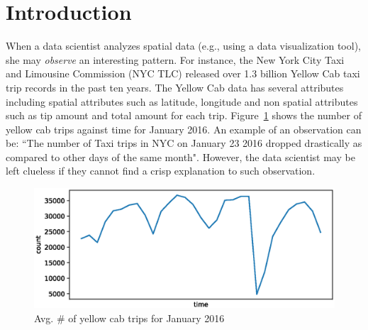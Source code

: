 \label{sec:Intro}
\section{Introduction}

When a data scientist analyzes spatial data (e.g., using a data visualization tool), she may {\em observe} an interesting pattern. 
For instance, the New York City Taxi and Limousine Commission (NYC TLC)\cite{taxi2016tlc} released over 1.3 billion Yellow Cab taxi trip records in the past ten years. The Yellow Cab data has several attributes including spatial attributes such as latitude, longitude and non spatial attributes such as tip amount and total amount for each trip. Figure~\ref{fig:yellowstats} shows the number of yellow cab trips against time for January 2016. 
An example of an observation can be: ``The number of Taxi trips in NYC on January 23 2016 dropped drastically as compared to other days of the same month". However, the data scientist may be left clueless if they cannot find a crisp explanation to such observation. 
\begin{figure}[htp]
	\includegraphics[width=\columnwidth]{images/yellowdata_count.eps}
	\caption{Avg. \# of yellow cab trips for January 2016}
	\label{fig:yellowstats}
\end{figure}
